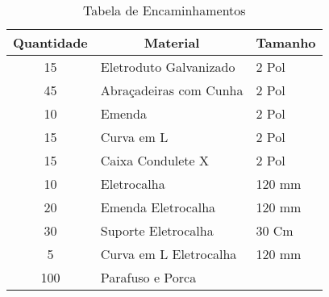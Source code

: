 \begin{table}[h!] %
	\centering
	\caption{Tabela de Encaminhamentos}
	\label{tabEncaminhamento} %
\begin{tabular}{|c|l|l|}
\hline
\textbf{Quantidade} & \multicolumn{1}{c|}{\textbf{Material}} & \multicolumn{1}{c|}{\textbf{Tamanho}} \\ \hline
15                  & Eletroduto Galvanizado                 & 2 Pol                                 \\ \hline
45                  & Abraçadeiras com Cunha                 & 2 Pol                                 \\ \hline
10                  & Emenda                                 & 2 Pol                                 \\ \hline
15                  & Curva em L                             & 2 Pol                                 \\ \hline
15                  & Caixa Condulete X                      & 2 Pol                                 \\ \hline
10                  & Eletrocalha                            & 120 mm                                \\ \hline
20                  & Emenda Eletrocalha                     & 120 mm                                \\ \hline
30                  & Suporte Eletrocalha                    & 30 Cm                                 \\ \hline
5                   & Curva em L Eletrocalha                 & 120 mm                                \\ \hline
100                 & Parafuso e Porca                       &                                       \\ \hline
\end{tabular}
\end{table}